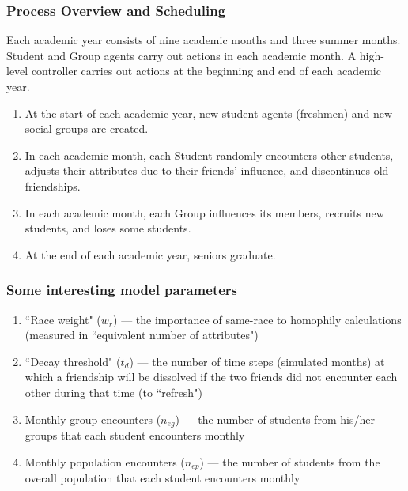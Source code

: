 \documentclass{beamer}
\begin{document}

\begin{frame}
\frametitle{Process Overview and Scheduling}
Each academic year consists of nine academic months and three summer months. Student and Group agents carry out actions in each academic month. A high-level controller carries out actions at the beginning and end of each academic year.\\

\begin{enumerate}
\item At the start of each academic year, new student agents (freshmen) and
new social groups are created.
\item In each academic month, each Student randomly encounters other students,
adjusts their attributes due to their friends' influence, and discontinues old
friendships.
\item In each academic month, each Group influences its members, recruits new
students, and loses some students. 
\item At the end of each academic year, seniors graduate.
\end{enumerate}
\end{frame}


\begin{frame}
\frametitle{Some interesting model parameters}

\begin{enumerate}
\item ``Race weight" ($w_r$) --- the importance of same-race to homophily
calculations (measured in ``equivalent number of attributes")

\item ``Decay threshold" ($t_d$) --- the number of time steps (simulated
months) at which a friendship will be dissolved if the two friends did not
encounter each other during that time (to ``refresh")

\item Monthly group encounters ($n_{eg}$) --- the number of students from
his/her groups that each student encounters monthly

\item Monthly population encounters ($n_{ep}$) --- the number of students from
the overall population that each student encounters monthly

\end{enumerate}

\end{frame}
\end{document}

